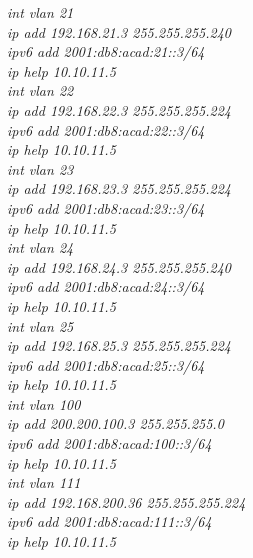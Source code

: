 \documentclass[a4paper, 12pt]{article}
\begin{document}
\hspace*{2cm}\textit{int vlan 21\\
\hspace*{2cm}ip add 192.168.21.3 255.255.255.240\\
\hspace*{2cm}ipv6 add 2001:db8:acad:21::3/64\\
\hspace*{2cm}ip help 10.10.11.5\\
\hspace*{2cm}int vlan 22\\
\hspace*{2cm}ip add 192.168.22.3 255.255.255.224\\
\hspace*{2cm}ipv6 add 2001:db8:acad:22::3/64\\
\hspace*{2cm}ip help 10.10.11.5\\
\hspace*{2cm}int vlan 23\\
\hspace*{2cm}ip add 192.168.23.3 255.255.255.224\\
\hspace*{2cm}ipv6 add 2001:db8:acad:23::3/64\\
\hspace*{2cm}ip help 10.10.11.5\\
\hspace*{2cm}int vlan 24\\
\hspace*{2cm}ip add 192.168.24.3 255.255.255.240\\
\hspace*{2cm}ipv6 add 2001:db8:acad:24::3/64\\
\hspace*{2cm}ip help 10.10.11.5\\
\hspace*{2cm}int vlan 25\\
\hspace*{2cm}ip add 192.168.25.3 255.255.255.224\\
\hspace*{2cm}ipv6 add 2001:db8:acad:25::3/64\\
\hspace*{2cm}ip help 10.10.11.5\\
\hspace*{2cm}int vlan 100\\
\hspace*{2cm}ip add 200.200.100.3 255.255.255.0\\
\hspace*{2cm}ipv6 add 2001:db8:acad:100::3/64\\
\hspace*{2cm}ip help 10.10.11.5\\
\hspace*{2cm}int vlan 111\\
\hspace*{2cm}ip add 192.168.200.36 255.255.255.224\\
\hspace*{2cm}ipv6 add 2001:db8:acad:111::3/64\\
\hspace*{2cm}ip help 10.10.11.5\\}
\end{document}
